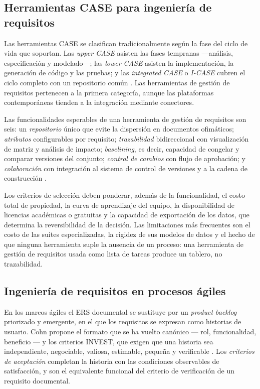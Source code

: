\documentclass[11pt,letterpaper]{article}
\begin{document}
\subsection{Herramientas CASE para ingeniería de requisitos}

Las herramientas CASE se clasifican tradicionalmente según la fase del ciclo de vida que soportan.
Las \emph{upper CASE} asisten las fases tempranas ---análisis, especificación y modelado---; las
\emph{lower CASE} asisten la implementación, la generación de código y las pruebas; y las
\emph{integrated CASE} o \emph{I-CASE} cubren el ciclo completo con un repositorio común
\cite{swebok4}. Las herramientas de gestión de requisitos pertenecen a la primera categoría, aunque
las plataformas contemporáneas tienden a la integración mediante conectores.

Las funcionalidades esperables de una herramienta de gestión de requisitos son seis: un
\emph{repositorio} único que evite la dispersión en documentos ofimáticos; \emph{atributos}
configurables por requisito; \emph{trazabilidad} bidireccional con visualización de matriz y análisis
de impacto; \emph{baselining}, es decir, capacidad de congelar y comparar versiones del conjunto;
\emph{control de cambios} con flujo de aprobación; y \emph{colaboración} con integración al sistema
de control de versiones y a la cadena de construcción \cite{wiegers2013, clelandhuang2012}.

Los criterios de selección deben ponderar, además de la funcionalidad, el costo total de propiedad,
la curva de aprendizaje del equipo, la disponibilidad de licencias académicas o gratuitas y la
capacidad de exportación de los datos, que determina la reversibilidad de la decisión. Las
limitaciones más frecuentes son el costo de las suites especializadas, la rigidez de sus modelos de
datos y el hecho de que ninguna herramienta suple la ausencia de un proceso: una herramienta de
gestión de requisitos usada como lista de tareas produce un tablero, no trazabilidad.

\subsection{Ingeniería de requisitos en procesos ágiles}

En los marcos ágiles el ERS documental se sustituye por un \emph{product backlog} priorizado y
emergente, en el que los requisitos se expresan como historias de usuario. Cohn propone el formato
que se ha vuelto canónico --- rol, funcionalidad, beneficio --- y los criterios INVEST, que exigen
que una historia sea independiente, negociable, valiosa, estimable, pequeña y verificable
\cite{cohn2004}. Los \emph{criterios de aceptación} completan la historia con las condiciones
observables de satisfacción, y son el equivalente funcional del criterio de verificación de un
requisito documental.
\end{document}
